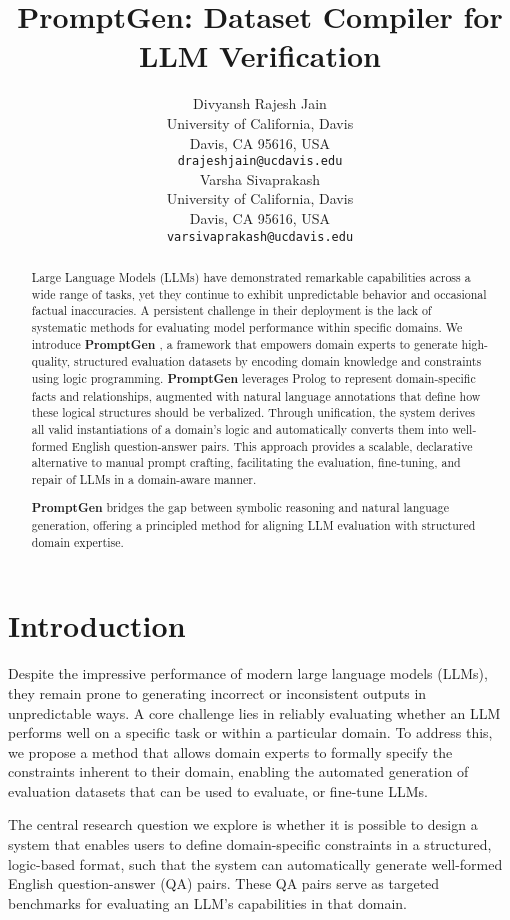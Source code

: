 \documentclass{article}
\title{PromptGen: Dataset Compiler for LLM Verification}
\author{ 
    Divyansh Rajesh Jain \\
    University of California, Davis \\
    Davis, CA 95616, USA \\
    \texttt{drajeshjain@ucdavis.edu} \\
    \And
    Varsha Sivaprakash\\
    University of California, Davis \\
    Davis, CA 95616, USA \\
    \texttt{varsivaprakash@ucdavis.edu} \\
}
\newcommand{\PromptGen}{
    {\bfseries PromptGen}
}
\begin{document}
\maketitle


\begin{abstract}
  Large Language Models (LLMs) have demonstrated remarkable capabilities across a wide range of tasks, 
  yet they continue to exhibit unpredictable behavior and occasional factual inaccuracies. 
  A persistent challenge in their deployment is the lack of systematic methods for evaluating model 
  performance within specific domains. We introduce \PromptGen, a framework that empowers domain experts 
  to generate high-quality, structured evaluation datasets by encoding domain knowledge and constraints 
  using logic programming. \PromptGen leverages Prolog to represent domain-specific facts and relationships, 
  augmented with natural language annotations that define how these logical structures should be verbalized. 
  Through unification, the system derives all valid instantiations of a domain’s logic and automatically converts 
  them into well-formed English question-answer pairs. This approach provides a scalable, declarative alternative 
  to manual prompt crafting, facilitating the evaluation, fine-tuning, and repair of LLMs in a domain-aware manner. 
  \PromptGen bridges the gap between symbolic reasoning and natural language generation, offering a principled method 
  for aligning LLM evaluation with structured domain expertise.
\end{abstract}

\section{Introduction}
Despite the impressive performance of modern large language models (LLMs), 
they remain prone to generating incorrect or inconsistent outputs in 
unpredictable ways. A core challenge lies in reliably evaluating whether 
an LLM performs well on a specific task or within a particular domain. 
To address this, we propose a method that allows domain experts to formally 
specify the constraints inherent to their domain, enabling the automated 
generation of evaluation datasets that can be used to evaluate, or fine-tune LLMs.

The central research question we explore is whether it is possible to design 
a system that enables users to define domain-specific constraints in a structured, 
logic-based format, such that the system can automatically generate well-formed 
English question-answer (QA) pairs. These QA pairs serve as targeted benchmarks 
for evaluating an LLM’s capabilities in that domain.
\end{document}
